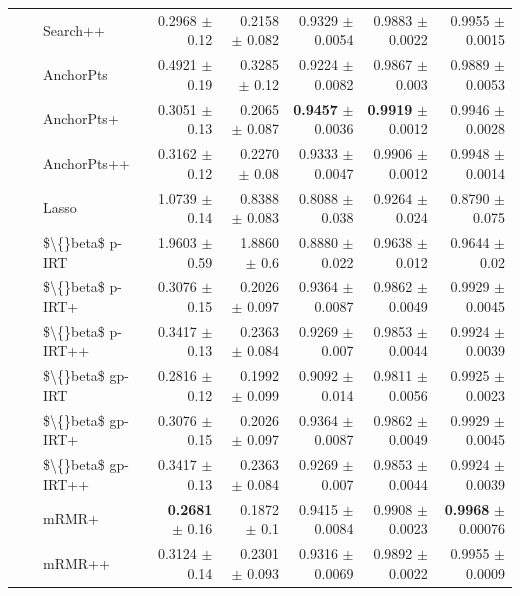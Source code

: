 \begin{longtable}{llp{}rrrrr}
 &  & Search++ & 0.2968 {\scriptsize $\pm$ 0.12} & 0.2158 {\scriptsize $\pm$ 0.082} & 0.9329 {\scriptsize $\pm$ 0.0054} & 0.9883 {\scriptsize $\pm$ 0.0022} & 0.9955 {\scriptsize $\pm$ 0.0015} \\
 &  & AnchorPts & 0.4921 {\scriptsize $\pm$ 0.19} & 0.3285 {\scriptsize $\pm$ 0.12} & 0.9224 {\scriptsize $\pm$ 0.0082} & 0.9867 {\scriptsize $\pm$ 0.003} & 0.9889 {\scriptsize $\pm$ 0.0053} \\
 &  & AnchorPts+ & 0.3051 {\scriptsize $\pm$ 0.13} & 0.2065 {\scriptsize $\pm$ 0.087} & \textbf{0.9457} {\scriptsize $\pm$ 0.0036} & \textbf{0.9919} {\scriptsize $\pm$ 0.0012} & 0.9946 {\scriptsize $\pm$ 0.0028} \\
 &  & AnchorPts++ & 0.3162 {\scriptsize $\pm$ 0.12} & 0.2270 {\scriptsize $\pm$ 0.08} & 0.9333 {\scriptsize $\pm$ 0.0047} & 0.9906 {\scriptsize $\pm$ 0.0012} & 0.9948 {\scriptsize $\pm$ 0.0014} \\
 &  & Lasso & 1.0739 {\scriptsize $\pm$ 0.14} & 0.8388 {\scriptsize $\pm$ 0.083} & 0.8088 {\scriptsize $\pm$ 0.038} & 0.9264 {\scriptsize $\pm$ 0.024} & 0.8790 {\scriptsize $\pm$ 0.075} \\
 &  & \$\textbackslash\{\}beta\$ p-IRT & 1.9603 {\scriptsize $\pm$ 0.59} & 1.8860 {\scriptsize $\pm$ 0.6} & 0.8880 {\scriptsize $\pm$ 0.022} & 0.9638 {\scriptsize $\pm$ 0.012} & 0.9644 {\scriptsize $\pm$ 0.02} \\
 &  & \$\textbackslash\{\}beta\$ p-IRT+ & 0.3076 {\scriptsize $\pm$ 0.15} & 0.2026 {\scriptsize $\pm$ 0.097} & 0.9364 {\scriptsize $\pm$ 0.0087} & 0.9862 {\scriptsize $\pm$ 0.0049} & 0.9929 {\scriptsize $\pm$ 0.0045} \\
 &  & \$\textbackslash\{\}beta\$ p-IRT++ & 0.3417 {\scriptsize $\pm$ 0.13} & 0.2363 {\scriptsize $\pm$ 0.084} & 0.9269 {\scriptsize $\pm$ 0.007} & 0.9853 {\scriptsize $\pm$ 0.0044} & 0.9924 {\scriptsize $\pm$ 0.0039} \\
 &  & \$\textbackslash\{\}beta\$ gp-IRT & 0.2816 {\scriptsize $\pm$ 0.12} & 0.1992 {\scriptsize $\pm$ 0.099} & 0.9092 {\scriptsize $\pm$ 0.014} & 0.9811 {\scriptsize $\pm$ 0.0056} & 0.9925 {\scriptsize $\pm$ 0.0023} \\
 &  & \$\textbackslash\{\}beta\$ gp-IRT+ & 0.3076 {\scriptsize $\pm$ 0.15} & 0.2026 {\scriptsize $\pm$ 0.097} & 0.9364 {\scriptsize $\pm$ 0.0087} & 0.9862 {\scriptsize $\pm$ 0.0049} & 0.9929 {\scriptsize $\pm$ 0.0045} \\
 &  & \$\textbackslash\{\}beta\$ gp-IRT++ & 0.3417 {\scriptsize $\pm$ 0.13} & 0.2363 {\scriptsize $\pm$ 0.084} & 0.9269 {\scriptsize $\pm$ 0.007} & 0.9853 {\scriptsize $\pm$ 0.0044} & 0.9924 {\scriptsize $\pm$ 0.0039} \\
 &  & mRMR+ & \textbf{0.2681} {\scriptsize $\pm$ 0.16} & 0.1872 {\scriptsize $\pm$ 0.1} & 0.9415 {\scriptsize $\pm$ 0.0084} & 0.9908 {\scriptsize $\pm$ 0.0023} & \textbf{0.9968} {\scriptsize $\pm$ 0.00076} \\
 &  & mRMR++ & 0.3124 {\scriptsize $\pm$ 0.14} & 0.2301 {\scriptsize $\pm$ 0.093} & 0.9316 {\scriptsize $\pm$ 0.0069} & 0.9892 {\scriptsize $\pm$ 0.0022} & 0.9955 {\scriptsize $\pm$ 0.0009} \\
\end{longtable}